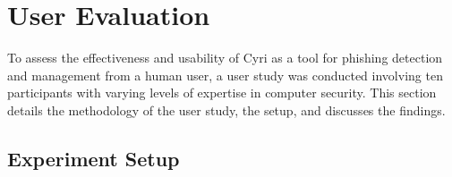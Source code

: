 \section{User Evaluation}
\label{sec:eval}
To assess the effectiveness and usability of Cyri as a tool for phishing detection and management from a human user, a user study was conducted involving ten participants with varying levels of expertise in computer security. This section details the methodology of the user study, the setup, and discusses the findings.

\subsection{Experiment Setup}
\label{sec:setup}

